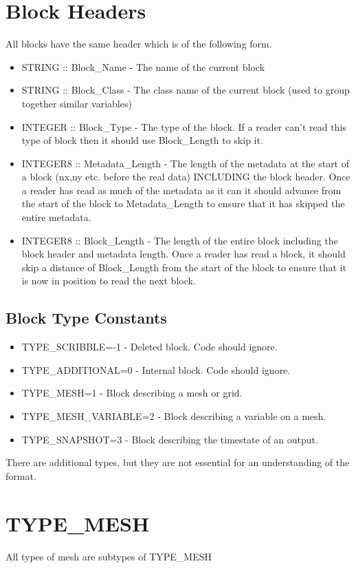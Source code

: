 \documentclass[8pt]{article}
\begin{document}
\section{Block Headers}
All blocks have the same header which is of the following form.\\
\begin{itemize}
\item STRING :: Block\_Name - The name of the current block
\item STRING :: Block\_Class - The class name of the current block (used to group together similar variables)
\item INTEGER :: Block\_Type - The type of the block. If a reader can't read this type of block then it should use Block\_Length to skip it.
\item INTEGER8 :: Metadata\_Length - The length of the metadata at the start of a block (nx,ny etc. before the real data) INCLUDING the block header. Once a reader has read as much of the metadata as it can it should advance from the start of the block to Metadata\_Length to ensure that it has skipped the entire metadata.
\item INTEGER8 :: Block\_Length - The length of the entire block including the block header and metadata length. Once a reader has read a block, it should skip a distance of Block\_Length from the start of the block to ensure that it is now in position to read the next block.
\end{itemize}
\subsection{Block Type Constants}
\begin{itemize}
  \item TYPE\_SCRIBBLE=-1 - Deleted block. Code should ignore.
  \item TYPE\_ADDITIONAL=0 - Internal block. Code should ignore.
  \item TYPE\_MESH=1 - Block describing a mesh or grid.
  \item TYPE\_MESH\_VARIABLE=2 - Block describing a variable on a mesh.
  \item TYPE\_SNAPSHOT=3 - Block describing the timestate of an output.
\end{itemize}
There are additional types, but they are not essential for an understanding of the format.
\section{TYPE\_MESH}
All types of mesh are subtypes of TYPE\_MESH
\end{document}
